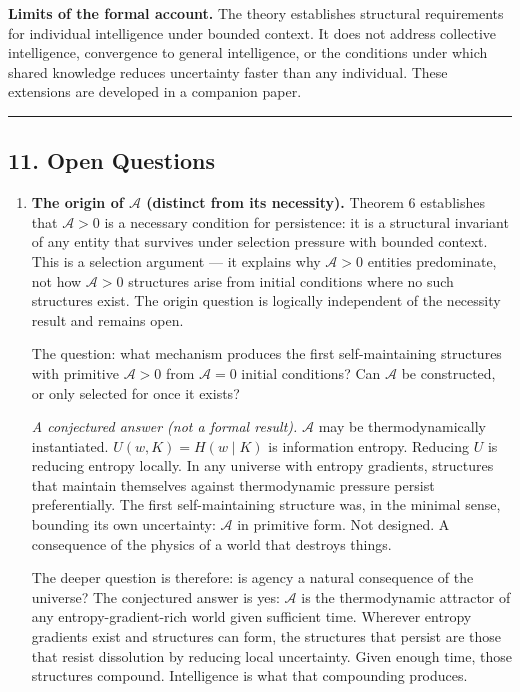 \documentclass[
]{article}
\begin{document}
\textbf{Limits of the formal account.} The theory establishes structural
requirements for individual intelligence under bounded context. It does
not address collective intelligence, convergence to general intelligence,
or the conditions under which shared knowledge reduces uncertainty faster
than any individual. These extensions are developed in a companion paper.

\begin{center}\rule{0.5\linewidth}{0.5pt}\end{center}

\subsection{11. Open Questions}\label{open-questions}

\begin{enumerate}
\def\labelenumi{\arabic{enumi}.}
\item
  \textbf{The origin of \(\mathcal{A}\) (distinct from its necessity).}
  Theorem 6 establishes that \(\mathcal{A} > 0\) is a necessary
  condition for persistence: it is a structural invariant of any entity
  that survives under selection pressure with bounded context. This is a
  selection argument --- it explains why \(\mathcal{A} > 0\) entities
  predominate, not how \(\mathcal{A} > 0\) structures arise from initial
  conditions where no such structures exist. The origin question is
  logically independent of the necessity result and remains open.

  The question: what mechanism produces the first self-maintaining
  structures with primitive \(\mathcal{A} > 0\) from \(\mathcal{A} = 0\)
  initial conditions? Can \(\mathcal{A}\) be constructed, or only
  selected for once it exists?

  \emph{A conjectured answer (not a formal result).} \(\mathcal{A}\) may
  be thermodynamically instantiated. \(U(w, K) = H(w \mid K)\) is
  information entropy. Reducing \(U\) is reducing entropy locally. In
  any universe with entropy gradients, structures that maintain
  themselves against thermodynamic pressure persist preferentially. The
  first self-maintaining structure was, in the minimal sense, bounding
  its own uncertainty: \(\mathcal{A}\) in primitive form. Not designed.
  A consequence of the physics of a world that destroys things.

  The deeper question is therefore: is agency a natural consequence of
  the universe? The conjectured answer is yes: \(\mathcal{A}\) is the
  thermodynamic attractor of any entropy-gradient-rich world given
  sufficient time. Wherever entropy gradients exist and structures can
  form, the structures that persist are those that resist dissolution by
  reducing local uncertainty. Given enough time, those structures
  compound. Intelligence is what that compounding produces.


\end{enumerate}
\end{document}

